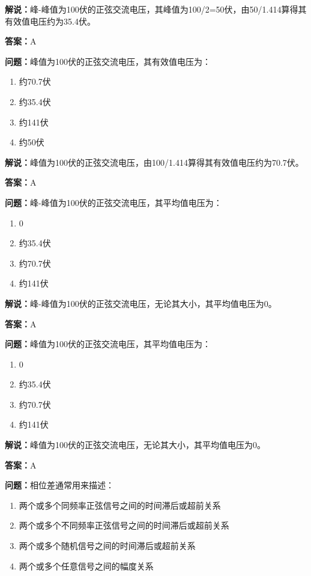 \documentclass[UTF8]{ctexbook}
\begin{document}
\textbf{解说：}峰-峰值为100伏的正弦交流电压，其峰值为100/2=50伏，由50/1.414算得其有效值电压约为35.4伏。%

\textbf{答案：}A

\textbf{问题：}峰值为100伏的正弦交流电压，其有效值电压为：

\begin{enumerate}[label=\Alph*), leftmargin=3em]
  \item 约70.7伏
  \item 约35.4伏
  \item 约141伏
  \item 约50伏
\end{enumerate}

\textbf{解说：}峰值为100伏的正弦交流电压，由100/1.414算得其有效值电压约为70.7伏。

\textbf{答案：}A

\textbf{问题：}峰-峰值为100伏的正弦交流电压，其平均值电压为：

\begin{enumerate}[label=\Alph*), leftmargin=3em]
  \item 0
  \item 约35.4伏
  \item 约70.7伏
  \item 约141伏
\end{enumerate}

\textbf{解说：}峰-峰值为100伏的正弦交流电压，无论其大小，其平均值电压为0。

\textbf{答案：}A

\textbf{问题：}峰值为100伏的正弦交流电压，其平均值电压为：

\begin{enumerate}[label=\Alph*), leftmargin=3em]
  \item 0
  \item 约35.4伏
  \item 约70.7伏
  \item 约141伏
\end{enumerate}

\textbf{解说：}峰值为100伏的正弦交流电压，无论其大小，其平均值电压为0。

\textbf{答案：}A

\textbf{问题：}相位差通常用来描述：

\begin{enumerate}[label=\Alph*), leftmargin=3em]
  \item 两个或多个同频率正弦信号之间的时间滞后或超前关系
  \item 两个或多个不同频率正弦信号之间的时间滞后或超前关系
  \item 两个或多个随机信号之间的时间滞后或超前关系
  \item 两个或多个任意信号之间的幅度关系
\end{enumerate}
\end{document}
